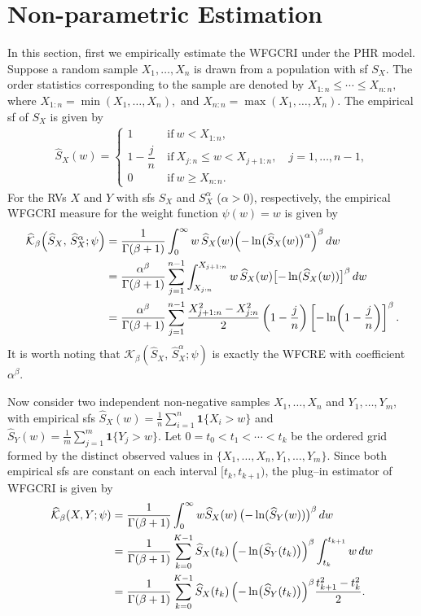 \documentclass[12pt,a4paper]{article}
\numberwithin{equation}{section}
\begin{document}
\section{Non-parametric Estimation}
In this section, first we  empirically estimate the WFGCRI under the PHR model. Suppose a random sample \(X_1,\ldots,X_n\) is drawn from a population with sf \(S_X\). 
The order statistics corresponding to the sample are denoted by
$
X_{1:n} \le \cdots \le X_{n:n},$ where
$X_{1:n} = \min(X_1,\ldots,X_n),$ and 
$X_{n:n} = \max(X_1,\ldots,X_n).
$
The empirical sf of \(S_X\) is given by
\begin{align}\label{4.1}
	\widehat S_X(w) 
	=
\begin{cases}
	1 &~\text{if}~ w < X_{1:n}, \\
	1-\dfrac{j}{n} &~\text{if}~ X_{j:n} \le w < X_{j+1:n},\quad j=1,\ldots,n-1, \\
	0 & ~\text{if}~w \ge X_{n:n}.
\end{cases}
\end{align}
For the RVs \(X\) and \(Y\) with sfs
\(S_X\) and \(S_X^\alpha\) (\(\alpha>0\)), respectively, the empirical WFGCRI measure for the 
weight function \(\psi(w)=w\)  is given by
\begin{align}\label{eq4.2}
    \widehat {\mathcal K}_\beta\!\left(\widehat S_X,\,\widehat S_X^\alpha; \psi\right)\nonumber
&=
\frac{{1}}{\Gamma(\beta+1)}\int_{0}^{\infty}
w\,\widehat S_X(w)
\Bigl(-\ln\bigl(\widehat S_X(w)\bigr)^\alpha\Bigr)^{\beta}\,dw\\\nonumber
&=
\frac{{\alpha^\beta}}{\Gamma(\beta+1)}\sum_{j=1}^{n-1}
\int_{X_{j:n}}^{X_{j+1:n}}
w\,\widehat S_X(w)
\bigl[-\ln(\widehat S_X(w))\bigr]^{\beta}\,dw\\
&=\frac{{\alpha^\beta}}{\Gamma(\beta+1)}
\sum_{j=1}^{n-1}
\frac{X_{j+1:n}^{2}-X_{j:n}^{2}}{2}
\left(1-\frac{j}{n}\right)
\left[-\ln\!\left(1-\frac{j}{n}\right)\right]^{\beta}.
\end{align}
It is worth noting that
$
\mathcal K_\beta\!\left(\widehat S_X,\,\widehat S_X^\alpha; \psi\right)
$
is exactly the WFCRE with coefficient \(\alpha^\beta\).

Now consider two independent non-negative samples
$X_1,\ldots,X_n$ and
$Y_1,\ldots,Y_m,$
with empirical sfs
$\widehat S_X(w)=\frac{1}{n}\sum_{i=1}^n \mathbf{1}\{X_i>w\}$ and
$\widehat S_Y(w)=\frac{1}{m}\sum_{j=1}^m \mathbf{1}\{Y_j>w\}.$
Let $0 = t_0 < t_1 < \cdots < t_k$
be the ordered grid formed by the distinct observed values in 
\(\{X_1,\ldots,X_n,Y_1,\ldots,Y_m\}\).
Since both empirical sfs are constant on each interval 
\([t_k,t_{k+1})\), the plug--in estimator of WFGCRI is given by
\begin{align}\label{4.3}
    \widehat{\mathcal K}_\beta(X,Y;\psi)\nonumber
&=\frac{{1}}{\Gamma(\beta+1)} \int_0^{\infty}w
\widehat S_X(w)\,
\bigl(-\ln(\widehat S_Y(w))\bigr)^{\beta}\,dw\\\nonumber
&=\frac{{1}}{\Gamma(\beta+1)} \sum_{k=0}^{K-1}
\widehat S_X(t_k)\,
\Bigl(-\ln\bigl(\widehat S_Y(t_k)\bigr)\Bigr)^{\beta}
\int_{t_k}^{t_{k+1}} w\,dw\\
&=\frac{{1}}{\Gamma(\beta+1)} \sum_{k=0}^{K-1}
\widehat S_X(t_k)\,
\Bigl(-\ln\bigl(\widehat S_Y(t_k)\bigr)\Bigr)^{\beta}
\frac{t_{k+1}^2-t_k^2}{2}.
\end{align}
\end{document}
